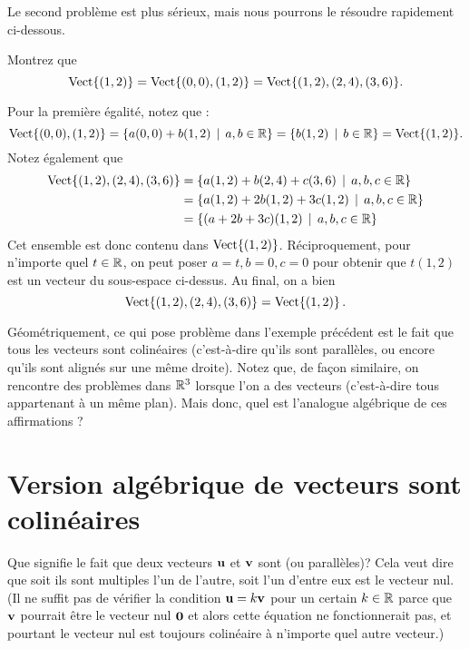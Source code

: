Le second problème est plus sérieux, mais nous pourrons le résoudre rapidement ci-dessous.

\begin{myprob} Montrez que
$$
\textrm{Vect}\{(1,2)\} = \textrm{Vect}\{ (0,0), (1,2) \} = \textrm{Vect}\{(1,2), (2,4), (3,6)\}.
$$

\begin{mysol} 
Pour la première égalité, notez que :
$$
\textrm{Vect}\{ (0,0), (1,2) \} = \{ a(0,0) + b(1,2) \, \mid \, a,b\in \mathbb{R}\} = \{ b(1,2) \, \mid \, b\in \mathbb{R}\} = \textrm{Vect}\{(1,2)\}.
$$
Notez également que
\begin{align*}
\textrm{Vect}\{(1,2), (2,4), (3,6)\} &= \{ a(1,2) + b(2,4) + c(3,6) \, \mid \, a,b,c\in\mathbb{R}\}\\
&= \{ a(1,2) + 2b(1,2) + 3c(1,2) \, \mid \, a,b,c\in \mathbb{R}\}\\
&= \{ (a+2b+3c)(1,2) \, \mid \,  a,b,c\in \mathbb{R}\}
\end{align*}
Cet ensemble est donc contenu dans $\textrm{Vect}\{(1,2)\}$.  
Réciproquement, pour n'importe quel $t\in \mathbb{R}$, on peut poser $a=t, b=0, c=0$ pour obtenir que $t(1,2)$ 
est un vecteur du sous-espace ci-dessus.  Au final, on a bien
$$
\textrm{Vect}\{(1,2), (2,4), (3,6)\} = \textrm{Vect}\{(1,2)\}\,.
$$
\end{mysol}\end{myprob}


Géométriquement, ce qui pose problème dans l'exemple précédent est le fait que tous les vecteurs sont
colinéaires (c'est-à-dire qu'ils sont parallèles, ou encore qu'ils sont alignés sur une même droite).  Notez que, de façon similaire, on rencontre des problèmes dans $\mathbb{R}^3$ lorsque l'on a des vecteurs 
(c'est-à-dire tous appartenant à un même plan).  Mais donc, quel est l'analogue algébrique
de ces affirmations ?

\section{Version algébrique de \texorpdfstring{ vecteurs sont colinéaires \fg}{2 vecteurs sont colinéaires}}

Que signifie le fait que deux vecteurs $\mathbf{u}$ et $\mathbf{v}$ sont  (ou parallèles)? Cela veut dire que 
soit ils sont multiples l'un de l'autre, soit l'un d'entre eux est le vecteur nul.
(Il ne suffit pas de vérifier la condition $\mathbf{u} = k \mathbf{v}$ pour un certain $k\in \mathbb{R}$ parce que
$\mathbf{v}$ pourrait être le vecteur nul $\mathbf{0}$ et alors cette équation ne fonctionnerait pas, et pourtant le vecteur nul est toujours colinéaire à n'importe quel autre vecteur.)

